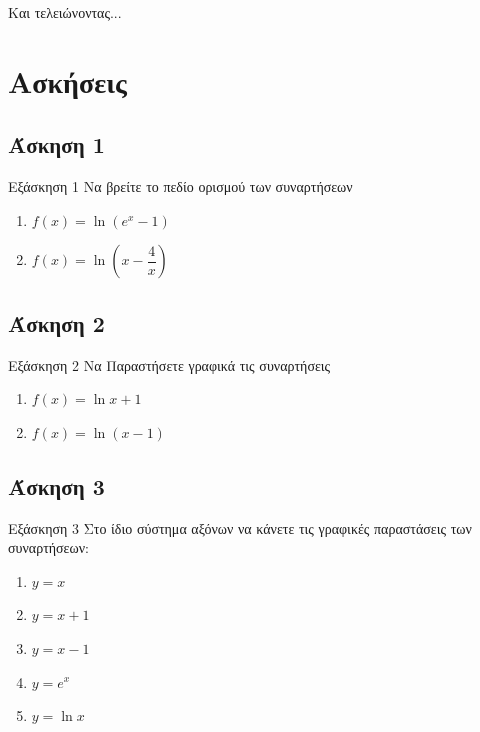 \documentclass[greek]{beamer}
\begin{document}
\begin{frame}{Και τελειώνοντας...}

\end{frame}

\section{Ασκήσεις}
\subsection{Άσκηση 1}
\begin{frame}[label=Άσκηση1,t]{Εξάσκηση 1}
 Να βρείτε το πεδίο ορισμού των συναρτήσεων
 \begin{enumerate}
  \item<1-> $f(x)=\ln (e^x-1)$
  \item<2-> $f(x)=\ln \left( x-\dfrac{4}{x} \right) $
 \end{enumerate}

\end{frame}

\subsection{Άσκηση 2}
\begin{frame}[label=Άσκηση2,t]{Εξάσκηση 2}
 Να Παραστήσετε γραφικά τις συναρτήσεις
 \begin{enumerate}
  \item<1-> $f(x)=\ln x+1$
  \item<2-> $f(x)=\ln (x-1)$
 \end{enumerate}

\end{frame}

\subsection{Άσκηση 3}
\begin{frame}[label=Άσκηση3,t]{Εξάσκηση 3}
 Στο ίδιο σύστημα αξόνων να κάνετε τις γραφικές παραστάσεις των συναρτήσεων:
 \begin{enumerate}
  \item $y=x$
  \item $y=x+1$
  \item $y=x-1$
  \item $y=e^x$
  \item $y=\ln x$
 \end{enumerate}

\end{frame}
\end{document}
